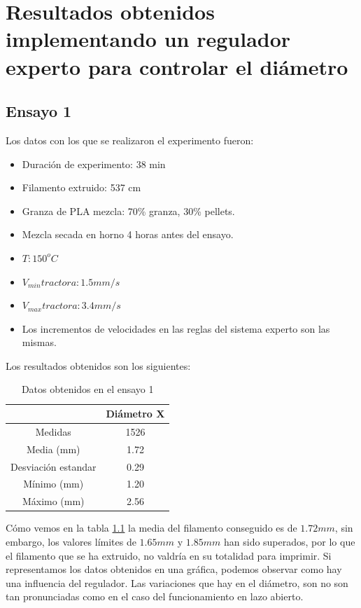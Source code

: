 \chapter[Resultados obtenidos implementando un regulador experto.]{Resultados obtenidos implementando un regulador experto para controlar el diámetro}
\label{ane:resultados_regu}
\section{Ensayo 1}

Los datos con los que se realizaron el experimento fueron:

\begin{itemize}
	\item{Duración de experimento: 38 min}
	\item{Filamento extruido: 537 cm}
	\item{Granza de PLA mezcla: 70\% granza, 30\% pellets.}
	\item{Mezcla secada en horno 4 horas antes del ensayo.}
	\item{$T: 150^oC$}
	\item{$V_{min} tractora: 1.5 mm/s$}
	\item{$V_{max} tractora: 3.4 mm/s$}
	\item{Los incrementos de velocidades en las reglas del sistema experto son las mismas.}
\end{itemize}

Los resultados obtenidos son los siguientes:

\begin{table}[H]
	\centering
	\begin{tabular}{cc}
		                    & Diámetro X \\ \hline
		Medidas             & 1526       \\
		Media (mm)          & 1.72       \\
		Desviación estandar & 0.29       \\
		Mínimo (mm)         & 1.20       \\
		Máximo (mm)         & 2.56      
	\end{tabular}
	\caption{Datos obtenidos en el ensayo 1}
	\label{tab:resl_ens1}
\end{table}

Cómo vemos en la tabla \ref{tab:resl_ens1} la media del filamento conseguido es de $1.72 mm$, sin embargo, los valores límites de $1.65 mm$ y $1.85 mm$ han sido superados, por lo que el filamento que se ha extruido, no valdría en su totalidad para imprimir. Si representamos los datos obtenidos en una gráfica, podemos observar como hay una influencia del regulador. Las variaciones que hay en el diámetro, son no son tan pronunciadas como en el caso del funcionamiento en lazo abierto. \\

